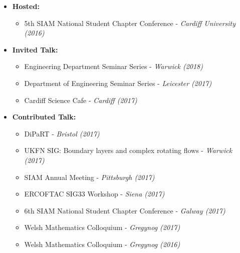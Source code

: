 \documentclass[10pt,a4paper,sans]{moderncv}        %
\begin{document}
	\begin{itemize}
		
		\item{\textbf{Hosted:} 
			\small{
				\begin{itemize}
					\vspace{3pt}
					\item 5th SIAM National Student Chapter Conference - \textit{Cardiff University (2016)}
		\end{itemize}}}
		
		\vspace{6pt}
		
		\item{\textbf{Invited Talk:}
			
			\small{
				\begin{itemize}
					\vspace{3pt}
					\item Engineering Department Seminar Series - \textit{Warwick (2018)}
					\vspace{3pt}
					\item Department of Engineering Seminar Series - \textit{Leicester (2017)}
					\vspace{3pt}
					\item Cardiff Science Cafe - \textit{Cardiff (2017)}
		\end{itemize}}}
		
		\vspace{6pt}
		
		\item{\textbf{Contributed Talk:}
			\begin{multicols}{2}
				\small{
					\begin{itemize}
						\item DiPaRT - \textit{Bristol (2017)}
						\vspace{3pt}
						\item UKFN SIG: Boundary layers and complex rotating flows - \textit{Warwick (2017)}
						\vspace{3pt}
						\item SIAM Annual Meeting - \textit{Pittsburgh (2017)}
						\vspace{3pt}
						\item ERCOFTAC SIG33 Workshop - \textit{Siena (2017)}
						\vspace{3pt}
						\item 6th SIAM National Student Chapter Conference - \textit{Galway (2017)}
						\vspace{3pt}
						\item Welsh Mathematics Colloquium - \textit{Gregynog (2017)}
						\vspace{3pt}
						\item Welsh Mathematics Colloquium - \textit{Gregynog (2016)}
		\end{itemize}}\end{multicols}}
		

\end{itemize}
\end{document}
